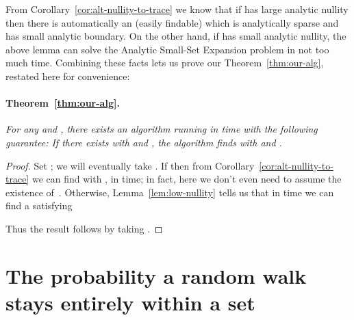 \documentclass[11pt]{article}
\begin{document}
From Corollary~\ref{cor:alt-nullity-to-trace} we know that if  has large analytic nullity then there is automatically an (easily findable)  which is analytically sparse and has small analytic boundary.  On the other hand, if  has small analytic nullity, the above lemma can solve the Analytic Small-Set Expansion problem in not too much time.  Combining these facts lets us prove our Theorem~\ref{thm:our-alg}, restated here for convenience:
\paragraph{Theorem~\ref{thm:our-alg}.} \emph{For any  and , there exists an algorithm running in time  with the following guarantee:  If there exists  with  and , the algorithm finds  with  and .}

\begin{proof}
    Set ; we will eventually take . If  then from Corollary~\ref{cor:alt-nullity-to-trace} we can find  with ,  in  time; in fact, here we don't even need to assume the existence of~. Otherwise, Lemma~\ref{lem:low-nullity} tells us that in time  we can find a  satisfying
    
    Thus the result follows by taking .
\end{proof}



\section{The probability a random walk stays entirely within a set}
\end{document}
